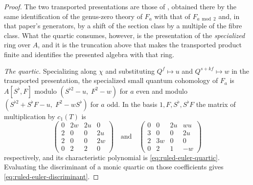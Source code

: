\begin{proof}
The two transported presentations are those of
\cite[Theorems~9.3.1 and~9.3.3]{Cotti}, obtained there by the same
identification of the genus-zero theory of \(F_a\) with that of
\(F_{a\bmod2}\) and, in that paper's generators, by a shift of the section
class by a multiple of the fibre class.  What the quartic consumes, however, is
the presentation of the \emph{specialized} ring over \(A\), and it is the
truncation above that makes the transported product finite and identifies the
presented algebra with that ring.

\emph{The quartic.}  Specializing along \(\chi\) and substituting
\(Q^f\mapsto u\) and \(Q^{s+kf}\mapsto w\) in the transported presentation,
the specialized small quantum cohomology of \(F_a\) is
\(A[S^\flat,F]\) modulo \((S^{\flat2}-u,\;F^2-w)\) for \(a\) even and modulo
\((S^{\flat2}+S^\flat F-u,\;F^2-wS^\flat)\) for \(a\) odd.  In the basis
\(1,F,S^\flat,S^\flat F\) the matrix of multiplication by \(c_1(T)\) is
\[
 \begin{pmatrix}
  0&2w&2u&0\\ 2&0&0&2u\\ 2&0&0&2w\\ 0&2&2&0
 \end{pmatrix}
 \quad\text{and}\quad
 \begin{pmatrix}
  0&0&2u&wu\\ 3&0&0&2u\\ 2&3w&0&0\\ 0&2&1&-w
 \end{pmatrix}
\]
respectively, and its characteristic polynomial is \eqref{eq:ruled-euler-quartic}.
Evaluating the discriminant of a monic quartic on those coefficients gives
\eqref{eq:ruled-euler-discriminant}.
\end{proof}

